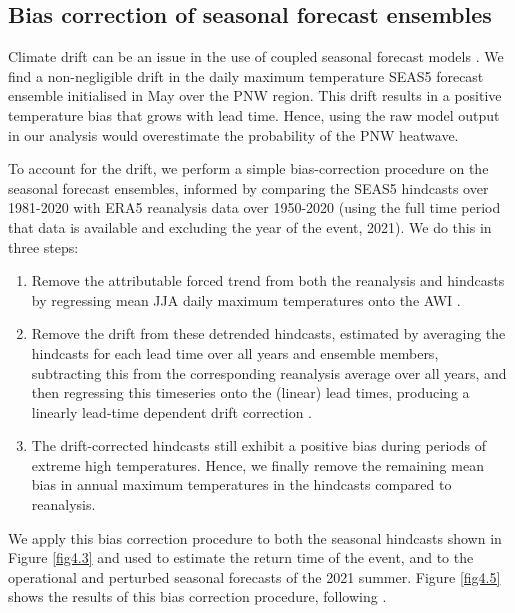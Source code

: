   \subsection*{Bias correction of seasonal forecast ensembles}
  
    Climate drift can be an issue in the use of coupled seasonal forecast models \cite{stockdale_coupled_1997}. We find a non-negligible drift in the daily maximum temperature SEAS5 forecast ensemble initialised in May over the PNW region. This drift results in a positive temperature bias that grows with lead time. Hence, using the raw model output in our analysis would overestimate the probability of the PNW heatwave. 
  
    To account for the drift, we perform a simple bias-correction procedure on the seasonal forecast ensembles, informed by comparing the SEAS5 hindcasts over 1981-2020 with ERA5 reanalysis data over 1950-2020 (using the full time period that data is available and excluding the year of the event, 2021). We do this in three steps:
    
    \begin{enumerate}
      \item Remove the attributable forced trend from both the reanalysis and hindcasts by regressing mean JJA daily maximum temperatures onto the AWI \cite{hasselmann_optimal_1993}.
      \item Remove the drift from these detrended hindcasts, estimated by averaging the hindcasts for each lead time over all years and ensemble members, subtracting this from the corresponding reanalysis average over all years, and then regressing this timeseries onto the (linear) lead times, producing a linearly lead-time dependent drift correction \cite{stockdale_coupled_1997}.
      \item The drift-corrected hindcasts still exhibit a positive bias during periods of extreme high temperatures. Hence, we finally remove the remaining mean bias in annual maximum temperatures in the hindcasts compared to reanalysis.
    \end{enumerate}
  
    We apply this bias correction procedure to both the seasonal hindcasts shown in Figure \ref{fig4.3} and used to estimate the return time of the event, and to the operational and perturbed seasonal forecasts of the 2021 summer. Figure \ref{fig4.5} shows the results of this bias correction procedure, following \citet{thompson_high_2017}.
  
